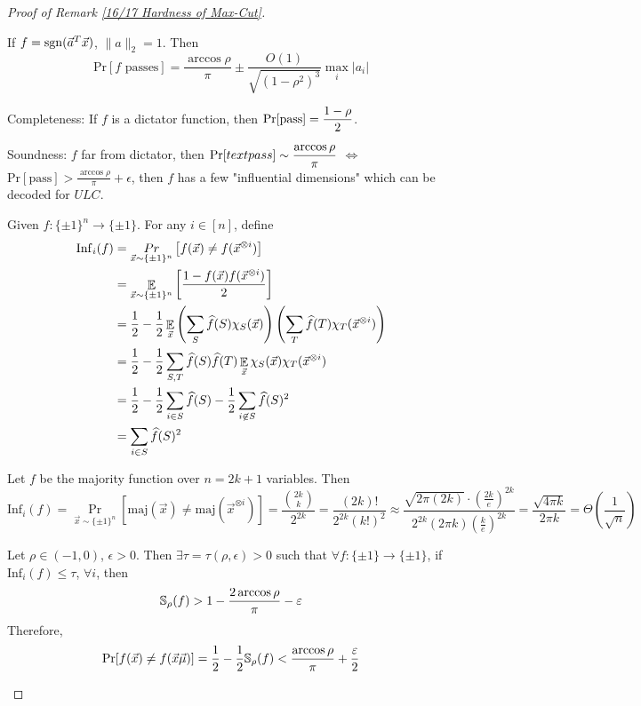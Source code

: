 \begin{proof}[Proof of Remark \ref{16/17 Hardness of Max-Cut}]
    \begin{lemma}
        If  $ f=\mathrm{sgn}(\vec{a}^T\vec{x}) $,  $ \|a\|_2=1 $. Then 
        \[\mathrm{Pr}[f\text{ passes}]=\frac{\arccos\rho}{\pi}\pm \frac{O(1)}{\sqrt{(1-\rho^2)^3}}\max_i|a_i|\]  
    \end{lemma}

    Completeness: If  $ f $ is a dictator function, then  $ \mathrm{Pr}[\text{pass}]=\displaystyle\frac{1-\rho}{2} $.
    
    Soundness:  $ f $ far from dictator, then $ \mathrm{Pr}[text{pass}]\sim \displaystyle\frac{\arccos\rho}{\pi} $ $ \Leftrightarrow $ $ \mathrm{Pr}[\text{pass}]>\frac{\arccos\rho}{\pi}+\epsilon $, then  $ f $ has a few "influential dimensions" which can be decoded for  $ ULC $. 
    
    \begin{definition}[Influence]
        Given  $ f:\{\pm 1\}^n\rightarrow\{\pm 1\} $. For any  $ i\in [n] $, define 
        \[\begin{aligned}
            \mathrm{Inf}_i(f)&=\mathop{Pr}_{\vec{x}\sim \{\pm 1\}^n}\left[f(\vec{x})\neq f(\vec{x}^{\otimes i})\right]\\
            &=\mathop\mathbb E_{\vec{x}\sim \{\pm 1\}^n}\left[\frac{1-f(\vec{x})f(\vec{x}^{\otimes i})}{2}\right]\\
            &=\frac{1}{2}-\frac{1}{2}\mathop\mathbb E_{\vec{x}}\left(\sum_S\widehat{f}(S)\chi_S(\vec{x})\right)\left(\sum_T\widehat{f}(T)\chi_T(\vec{x}^{\otimes i})\right)\\
            &=\frac{1}{2}-\frac{1}{2}\sum_{S,T}\widehat{f}(S)\widehat{f}(T)\mathop\mathbb E_{\vec{x}}\chi_S(\vec{x})\chi_T(\vec{x}^{\otimes i})\\
            &=\frac{1}{2}-\frac{1}{2}\sum_{i\in S}\widehat{f}(S)-\frac{1}{2}\sum_{i\not\in S}\widehat{f}(S)^2\\
            &=\sum_{i\in S}\widehat{f}(S)^2
        \end{aligned}\]  
    \end{definition}
    \begin{example}
        Let  $ f $ be the majority function over  $ n=2k+1 $ variables. Then 
        \[\mathrm{Inf}_i(f)=\mathop{Pr}_{\vec{x}\sim \{\pm1\}^n}[\mathrm{maj}(\vec{x})\neq \mathrm{maj}(\vec{x}^{\otimes i})]=\frac{\binom{2k}{k}}{2^{2k}}=\frac{(2k)!}{2^{2k}(k!)^2}\approx\frac{\sqrt{2\pi (2k)}\cdot\left(\frac{2k}{e}\right)^{2k}}{2^{2k}(2\pi k)\left(\frac{k}{e}\right)^{2k}}=\frac{\sqrt{4\pi k}}{2\pi k}=\Theta(\frac{1}{\sqrt{n}})\]  
    \end{example}
    \begin{theorem}
        Let  $ \rho\in (-1,0) $,  $ \epsilon>0 $. Then  $ \exists \tau=\tau(\rho,\epsilon)>0 $ such that  $ \forall f:\{\pm 1\}\rightarrow\{\pm 1\} $, if  $ \mathrm{Inf}_i(f) \leq \tau $,  $ \forall i $, then 
        \[{\mathbb S}_{\rho}(f)>1-\frac{2\arccos\rho}{\pi}-\varepsilon\]
        Therefore,
        \[\mathrm{Pr}[f(\vec{x})\neq f(\vec{x}\vec{\mu})]=\frac{1}2{}-\frac12{\mathbb S}_{\rho}(f)<\frac{\arccos\rho}{\pi}+\frac{\varepsilon}{2}\]      
    \end{theorem}
\end{proof}


